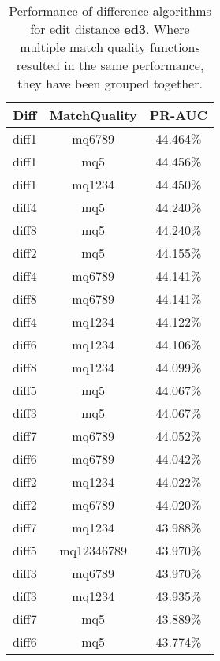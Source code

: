 \begin{table}[tbph]
\begin{center}
\begin{tabular}{|c|c||c|}
\hline
Diff & MatchQuality & PR-AUC  \\
\hline
\hline
diff1 & mq6789 & 44.464\% \\
diff1 & mq5 & 44.456\% \\
diff1 & mq1234 & 44.450\% \\
diff4 & mq5 & 44.240\% \\
diff8 & mq5 & 44.240\% \\
diff2 & mq5 & 44.155\% \\
diff4 & mq6789 & 44.141\% \\
diff8 & mq6789 & 44.141\% \\
diff4 & mq1234 & 44.122\% \\
diff6 & mq1234 & 44.106\% \\
diff8 & mq1234 & 44.099\% \\
diff5 & mq5 & 44.067\% \\
diff3 & mq5 & 44.067\% \\
diff7 & mq6789 & 44.052\% \\
diff6 & mq6789 & 44.042\% \\
diff2 & mq1234 & 44.022\% \\
diff2 & mq6789 & 44.020\% \\
diff7 & mq1234 & 43.988\% \\
diff5 & mq12346789 & 43.970\% \\
diff3 & mq6789 & 43.970\% \\
diff3 & mq1234 & 43.935\% \\
diff7 & mq5 & 43.889\% \\
diff6 & mq5 & 43.774\% \\
\hline
\end{tabular}
\end{center}
\caption[Comparison of diff algorithms using edit distance \textbf{ed3}]{
  Performance of difference algorithms for
  edit distance \textbf{ed3}.  Where multiple match
  quality functions resulted in the same performance, they
  have been grouped together.}
\label{tab:editlongbyed3}
\end{table}
